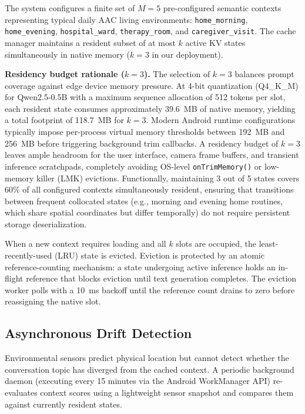 \documentclass[journal]{IEEEtran}
\begin{document}
The system configures a finite set of $M = 5$ pre-configured semantic contexts representing typical daily AAC living environments: \texttt{home\_morning}, \texttt{home\_evening}, \texttt{hospital\_ward}, \texttt{therapy\_room}, and \texttt{caregiver\_visit}. The cache manager maintains a resident subset of at most $k$ active KV states simultaneously in native memory ($k = 3$ in our deployment).

\textbf{Residency budget rationale ($k = 3$).} The selection of $k = 3$ balances prompt coverage against edge device memory pressure. At 4-bit quantization (Q4\_K\_M) for Qwen2.5-0.5B with a maximum sequence allocation of 512 tokens per slot, each resident state consumes approximately 39.6~MB of native memory, yielding a total footprint of 118.7~MB for $k = 3$. Modern Android runtime configurations typically impose per-process virtual memory thresholds between 192~MB and 256~MB before triggering background trim callbacks. A residency budget of $k = 3$ leaves ample headroom for the user interface, camera frame buffers, and transient inference scratchpads, completely avoiding OS-level \texttt{onTrimMemory()} or low-memory killer (LMK) evictions. Functionally, maintaining 3 out of 5 states covers 60\% of all configured contexts simultaneously resident, ensuring that transitions between frequent collocated states (e.g., morning and evening home routines, which share spatial coordinates but differ temporally) do not require persistent storage deserialization.

When a new context requires loading and all $k$ slots are occupied, the least-recently-used (LRU) state is evicted. Eviction is protected by an atomic reference-counting mechanism: a state undergoing active inference holds an in-flight reference that blocks eviction until text generation completes. The eviction worker polls with a 10~ms backoff until the reference count drains to zero before reassigning the native slot.

\subsection{Asynchronous Drift Detection}
\label{sec:drift}

Environmental sensors predict physical location but cannot detect whether the conversation topic has diverged from the cached context. A periodic background daemon (executing every 15 minutes via the Android WorkManager API) re-evaluates context scores using a lightweight sensor snapshot and compares them against currently resident states.
\end{document}
